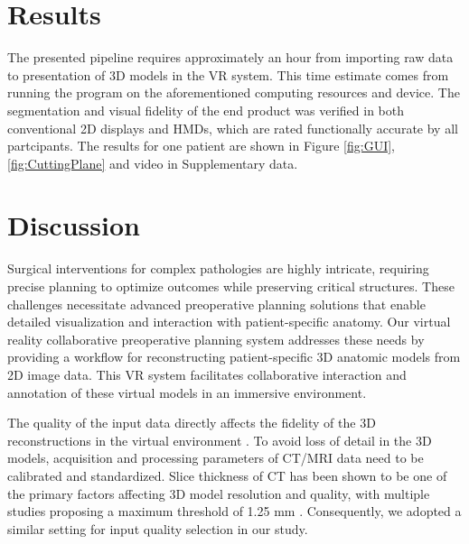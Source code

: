 \documentclass[sn-mathphys-num]{sn-jnl}%
\theoremstyle{thmstyleone}%
\theoremstyle{thmstyletwo}%
\theoremstyle{thmstylethree}%
\begin{document}
\section{Results}
The presented pipeline requires approximately an hour from importing raw data to presentation of 3D models in the VR system. This time estimate comes from running the program on the aforementioned computing resources and device. 
The segmentation and visual fidelity of the end product was verified in both conventional 2D displays and HMDs, which are rated functionally accurate by all partcipants. The results for one patient are shown in Figure \ref{fig:GUI}, \ref{fig:CuttingPlane} and video in Supplementary data. 
\section{Discussion}
Surgical interventions for complex pathologies are highly intricate, requiring precise planning to optimize outcomes while preserving critical structures. These challenges necessitate advanced preoperative planning solutions that enable detailed visualization and interaction with patient-specific anatomy. Our virtual reality collaborative preoperative planning system addresses these needs by providing a workflow for reconstructing patient-specific 3D anatomic models from 2D image data. This VR system facilitates collaborative interaction and annotation of these virtual models in an immersive environment.

The quality of the input data directly affects the fidelity of the 3D reconstructions in the virtual environment \cite{RN7, RN45}. To avoid loss of detail in the 3D models, acquisition and processing parameters of CT/MRI data need to be calibrated and standardized. Slice thickness of CT has been shown to be one of the primary factors affecting 3D model resolution and quality, with multiple studies proposing a maximum threshold of 1.25 mm \cite{RN7, RN47}. Consequently, we adopted a similar setting for input quality selection in our study.
\end{document}
